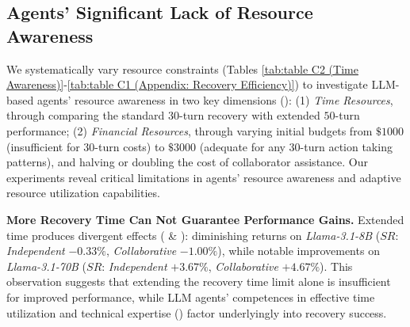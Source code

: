 





\subsection{Agents' Significant Lack of Resource Awareness}
\label{Section: Resource Awareness}


We systematically vary resource constraints (Tables \ref{tab:table C2 (Time Awareness)}-\ref{tab:table C1 (Appendix: Recovery Efficiency)}) to investigate LLM-based agents' resource awareness in two key dimensions ():
(1) \textit{Time Resources}, through comparing the standard $30$-turn recovery with extended $50$-turn performance;
(2) \textit{Financial Resources}, through varying initial budgets from $\$1000$ (insufficient for $30$-turn costs) to $\$3000$ (adequate for any $30$-turn action taking patterns), and halving or doubling the cost of collaborator assistance.
Our experiments reveal critical limitations in agents' resource awareness and adaptive resource utilization capabilities.

\textbf{More Recovery Time Can Not Guarantee Performance Gains.}
Extended time produces divergent effects ( \& ):
diminishing returns on \textit{Llama-3.1-8B} ($SR$: \textit{Independent} $-0.33\%$, \textit{Collaborative} $-1.00\%$),
while notable improvements on \textit{Llama-3.1-70B} ($SR$: \textit{Independent} $+3.67\%$, \textit{Collaborative} $+4.67\%$).
This observation suggests that extending the recovery time limit alone is insufficient for improved performance, while LLM agents' competences in effective time utilization and technical expertise () factor underlyingly into recovery success.

